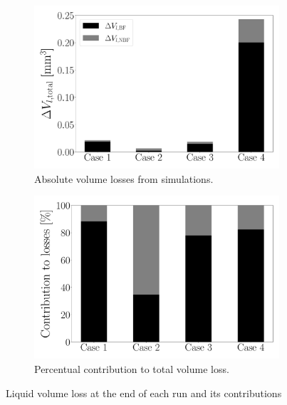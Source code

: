 \begin{figure}[ht]
\centering
\begin{subfigure}[b]{0.45\textwidth}
	\centering
   \includegraphics[scale=0.2]{./part2_developments/figures_ch5_resolved_JICF/flow_rates_mass_loss_set_levelset_band/bar_graph_dv_l}
   \vspace*{-0.2in}
   \caption{Absolute volume losses from simulations.}
\end{subfigure}
\hfill
\begin{subfigure}[b]{0.45\textwidth}
	\centering
   \includegraphics[scale=0.2]{./part2_developments/figures_ch5_resolved_JICF/flow_rates_mass_loss_set_levelset_band/bar_graph_losses_percentage}
   \vspace*{-0.2in}
   \caption{Percentual contribution to total volume loss.}
\end{subfigure}

   \caption{Liquid volume loss at the end of each run and its contributions}
\label{fig:JICF_liquid_losses_bar_graph}
\end{figure}

